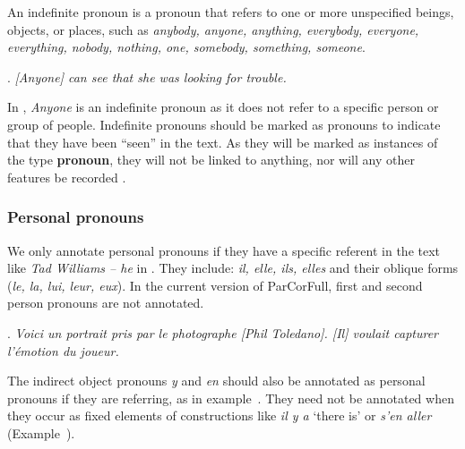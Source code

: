 \documentclass[a4paper]{article}
\begin{document}
An indefinite pronoun is a pronoun that refers to one or more unspecified beings, objects, or places, such as {\sl anybody, anyone, anything, everybody, everyone, everything, nobody, nothing, one, somebody, something, someone}.

\ex. {\sl [Anyone] can see that she was looking for trouble.}

In \Last, {\sl Anyone} is an indefinite pronoun as it does not refer to a specific person or group of people. Indefinite pronouns should be marked as pronouns to indicate that they have been ``seen'' in the text. As they will be marked as instances of the type {\bf pronoun}, they will not be linked to anything, nor will any other features be recorded \cite[p. 9]{GuillouEtAlGuide}.

\subsubsection{Personal pronouns}

We only annotate personal pronouns if they have a specific referent in the text like {\sl Tad Williams -- he} in \Next. %
They include: \textsl{il, elle, ils, elles} and their oblique forms
({\sl le, la, lui, leur, eux}). In the current version of ParCorFull, first and
second person pronouns are not annotated.

\ex.
\textsl{Voici un portrait pris par le photographe [Phil Toledano]. [Il] voulait
capturer l'émotion du joueur.}

The indirect object pronouns \textsl{y} and \textsl{en} should also be annotated
as personal pronouns if they are referring, as in example~\Next[a]. They need
not be annotated when they occur as fixed elements of constructions like
\textsl{il y a} `there is' or \textsl{s'en aller} (Example~\Next[b]).
\end{document}
